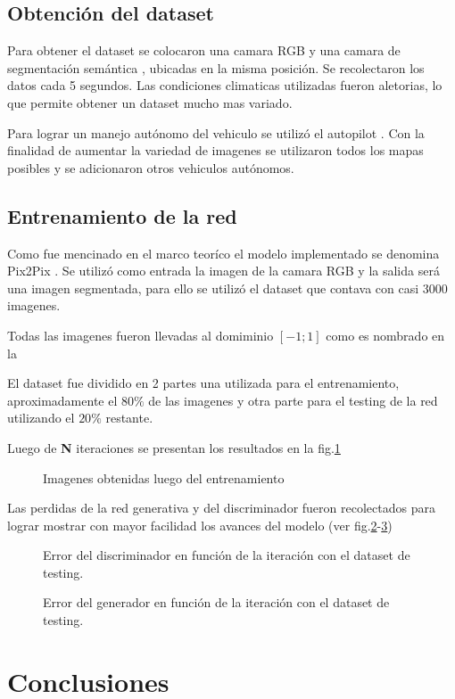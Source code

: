 \documentclass[]{IEEEtran}
\begin{document}
    \subsection{Obtención del dataset}

    Para obtener el dataset se colocaron una camara RGB y una camara de segmentación semántica
    \cite{CARLA-Sensors-Reference}, ubicadas en la misma posición. Se recolectaron los datos 
    cada 5 segundos. Las condiciones climaticas utilizadas fueron aletorias, lo que permite 
    obtener un dataset mucho mas variado.

    Para lograr un manejo autónomo del vehiculo se utilizó el autopilot \cite{CARLA-Documentation}. 
    Con la finalidad de aumentar la variedad de imagenes se utilizaron todos los mapas posibles y 
    se adicionaron otros vehiculos autónomos.

    \subsection{Entrenamiento de la red}

    Como fue mencinado en el marco teoríco el modelo implementado se denomina Pix2Pix \cite{Pix2Pix}.
    Se utilizó como entrada la imagen de la camara RGB y la salida será una imagen segmentada, para ello se utilizó
    el dataset que contava con casi 3000 imagenes. 

    Todas las imagenes fueron llevadas al domiminio $[-1;1]$ como es nombrado en la 

    El dataset fue dividido en 2 partes una utilizada para el entrenamiento, aproximadamente el $80 \% $ de las imagenes y 
    otra parte para el testing de la red utilizando el $20 \%$ restante.

    Luego de \textbf{N} iteraciones se presentan los resultados en la fig.\ref{fig:resultados}

    \begin{figure}[htb]
        \centering
        \caption{Imagenes obtenidas luego del entrenamiento}
        \label{fig:resultados}
    \end{figure}

    Las perdidas de la red generativa y del discriminador fueron recolectados para 
    lograr mostrar con mayor facilidad los avances del modelo (ver fig.\ref{fig:error-discriminador}-\ref{fig:error-generador})

    \begin{figure}[htb]
        \centering
        
        \caption{Error del discriminador en función de la iteración con el dataset de testing.}
        \label{fig:error-discriminador}
    \end{figure}

    \begin{figure}[htb]
        \centering
        
        \caption{Error del generador en función de la iteración con el dataset de testing.}
        \label{fig:error-generador}
    \end{figure}

    \section{Conclusiones}

    
    
\end{document}
